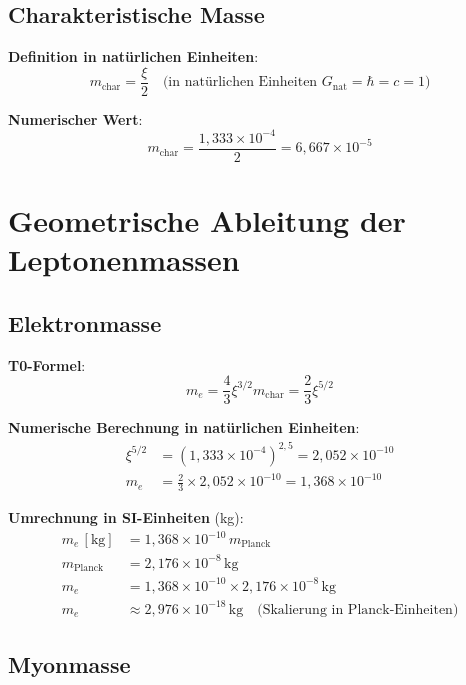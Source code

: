 \documentclass[12pt,a4paper]{article}
\newcommand{\xipar}{\xi}
\newcommand{\mchar}{m_{\text{char}}}
\begin{document}
	\subsection{Charakteristische Masse}
	
	\textbf{Definition in natürlichen Einheiten}:
	\begin{equation}
		\mchar = \frac{\xipar}{2} \quad \text{(in natürlichen Einheiten } G_{\text{nat}} = \hbar = c = 1\text{)}
	\end{equation}
	
	\textbf{Numerischer Wert}:
	\begin{equation}
		\mchar = \frac{1{,}333 \times 10^{-4}}{2} = 6{,}667 \times 10^{-5}
	\end{equation}
	
\section{Geometrische Ableitung der Leptonenmassen}

\subsection{Elektronmasse}

\textbf{T0-Formel}:
\begin{equation}
	m_e = \frac{4}{3} \xipar^{3/2} \mchar = \frac{2}{3} \xipar^{5/2}
\end{equation}

\textbf{Numerische Berechnung in natürlichen Einheiten}:
\begin{align}
	\xipar^{5/2} &= (1{,}333 \times 10^{-4})^{2{,}5} = 2{,}052 \times 10^{-10} \\
	m_e &= \frac{2}{3} \times 2{,}052 \times 10^{-10} = 1{,}368 \times 10^{-10}
\end{align}

\textbf{Umrechnung in SI-Einheiten} (kg):
\begin{align}
	m_e \,[\text{kg}] &= 1{,}368 \times 10^{-10} \, m_\text{Planck} \\
	m_\text{Planck} &= 2{,}176 \times 10^{-8}\,\text{kg} \\
	m_e &= 1{,}368 \times 10^{-10} \times 2{,}176 \times 10^{-8} \,\text{kg} \\
	m_e &\approx 2{,}976 \times 10^{-18}\,\text{kg} \quad \text{(Skalierung in Planck-Einheiten)}
\end{align}

\subsection{Myonmasse}
\end{document}

